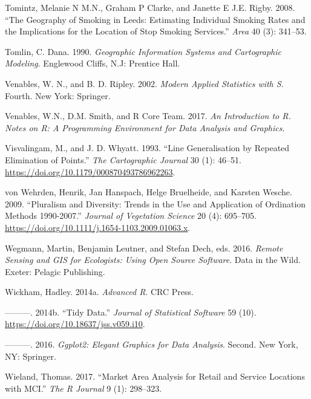 \documentclass[]{krantz}
\begin{document}
\leavevmode\hypertarget{ref-tomintz_geography_2008}{}%
Tomintz, Melanie N M.N., Graham P Clarke, and Janette E J.E. Rigby. 2008. ``The Geography of Smoking in Leeds: Estimating Individual Smoking Rates and the Implications for the Location of Stop Smoking Services.'' \emph{Area} 40 (3): 341--53.

\leavevmode\hypertarget{ref-tomlin_geographic_1990}{}%
Tomlin, C. Dana. 1990. \emph{Geographic Information Systems and Cartographic Modeling}. Englewood Cliffs, N.J: Prentice Hall.

\leavevmode\hypertarget{ref-venables_modern_2002}{}%
Venables, W. N., and B. D. Ripley. 2002. \emph{Modern Applied Statistics with S}. Fourth. New York: Springer.

\leavevmode\hypertarget{ref-venables_introduction_2017}{}%
Venables, W.N., D.M. Smith, and R Core Team. 2017. \emph{An Introduction to R. Notes on R: A Programming Environment for Data Analysis and Graphics}.

\leavevmode\hypertarget{ref-visvalingam_line_1993}{}%
Visvalingam, M., and J. D. Whyatt. 1993. ``Line Generalisation by Repeated Elimination of Points.'' \emph{The Cartographic Journal} 30 (1): 46--51. \url{https://doi.org/10.1179/000870493786962263}.

\leavevmode\hypertarget{ref-vonwehrden_pluralism_2009}{}%
von Wehrden, Henrik, Jan Hanspach, Helge Bruelheide, and Karsten Wesche. 2009. ``Pluralism and Diversity: Trends in the Use and Application of Ordination Methods 1990-2007.'' \emph{Journal of Vegetation Science} 20 (4): 695--705. \url{https://doi.org/10.1111/j.1654-1103.2009.01063.x}.

\leavevmode\hypertarget{ref-wegmann_remote_2016}{}%
Wegmann, Martin, Benjamin Leutner, and Stefan Dech, eds. 2016. \emph{Remote Sensing and GIS for Ecologists: Using Open Source Software}. Data in the Wild. Exeter: Pelagic Publishing.

\leavevmode\hypertarget{ref-wickham_advanced_2014}{}%
Wickham, Hadley. 2014a. \emph{Advanced R}. CRC Press.

\leavevmode\hypertarget{ref-wickham_tidy_2014}{}%
---------. 2014b. ``Tidy Data.'' \emph{Journal of Statistical Software} 59 (10). \url{https://doi.org/10.18637/jss.v059.i10}.

\leavevmode\hypertarget{ref-wickham_ggplot2_2016}{}%
---------. 2016. \emph{Ggplot2: Elegant Graphics for Data Analysis}. Second. New York, NY: Springer.

\leavevmode\hypertarget{ref-wieland_market_2017}{}%
Wieland, Thomas. 2017. ``Market Area Analysis for Retail and Service Locations with MCI.'' \emph{The R Journal} 9 (1): 298--323.
\end{document}
